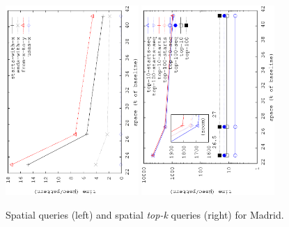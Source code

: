 	\begin{figure}[htb]
		\begin{center}
			{\includegraphics[angle=-90,width=0.45\textwidth]{figures_synt/madrid_spatial.eps}}
			{\includegraphics[angle=-90,width=0.45\textwidth]{figures_synt/madrid_spatial_topk.eps}}
		\end{center}
		\vspace{-0.3cm}
		\caption{Spatial queries (left) and spatial {\em top-k} queries (right) for Madrid.}
		\label{fig:madridsp}
		\vspace{-0.3cm}





\end{figure}
